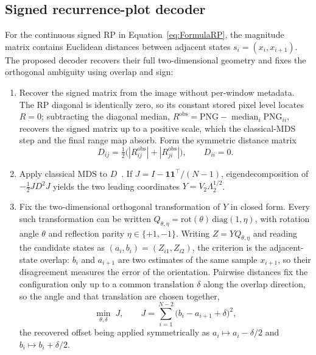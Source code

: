 \documentclass[5p]{elsarticle}
\begin{document}
\subsection{Signed recurrence-plot decoder}\label{sec:rp_reconstruction_method}

For the continuous signed RP in Equation~\ref{eq:FormulaRP}, the magnitude matrix contains Euclidean distances between adjacent states \(s_i=(x_i,x_{i+1})\). The proposed decoder recovers their full two-dimensional geometry and fixes the orthogonal ambiguity using overlap and sign:


\begin{enumerate}
\item Recover the signed matrix from the image without per-window metadata. The RP diagonal is identically zero, so its constant stored pixel level locates \(R=0\); subtracting the diagonal median, \(R^{\mathrm{obs}}=\mathrm{PNG}-\operatorname{median}_i\mathrm{PNG}_{ii}\), recovers the signed matrix up to a positive scale, which the classical-MDS step and the final range map absorb. Form the symmetric distance matrix
\[
D_{ij}=\tfrac12\bigl(|R^{\mathrm{obs}}_{ij}|+|R^{\mathrm{obs}}_{ji}|\bigr),\qquad D_{ii}=0.
\]
\item Apply classical MDS to \(D\)~\cite{Torgerson1952}. If \(J=I-\mathbf1\mathbf1^\top/(N-1)\), eigendecomposition of \(-\tfrac12JD^2J\) yields the two leading coordinates \(Y=V_2\Lambda_2^{1/2}\).

\item Fix the two-dimensional orthogonal transformation of \(Y\) in closed form. Every such transformation can be written \(Q_{\theta,\eta}=\mathrm{rot}(\theta)\,\mathrm{diag}(1,\eta)\), with rotation angle \(\theta\) and reflection parity \(\eta\in\{+1,-1\}\). Writing \(Z=YQ_{\theta,\eta}\) and reading the candidate states as \((a_i,b_i)=(Z_{i1},Z_{i2})\), the criterion is the adjacent-state overlap: \(b_i\) and \(a_{i+1}\) are two estimates of the same sample \(x_{i+1}\), so their disagreement measures the error of the orientation. Pairwise distances fix the configuration only up to a common translation \(\delta\) along the overlap direction, so the angle and that translation are chosen together,
\[
\min_{\theta,\delta}\;J,
\qquad
J=\sum_{i=1}^{N-2}{\bigl(b_i-a_{i+1}+\delta\bigr)}^2,
\]
the recovered offset being applied symmetrically as \(a_i\mapsto a_i-\delta/2\) and \(b_i\mapsto b_i+\delta/2\).


\end{enumerate}
\end{document}
